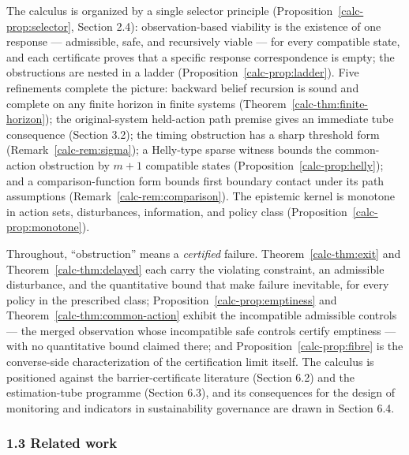 \documentclass[10pt,twocolumn]{article}
\theoremstyle{definition}
\begin{document}
The calculus is organized by a single selector principle (Proposition~\ref{calc-prop:selector}, Section 2.4):
observation-based viability is the existence of one response ---
admissible, safe, and recursively viable --- for every compatible state,
and each certificate proves that a specific response correspondence is
empty; the obstructions are nested in a ladder
(Proposition~\ref{calc-prop:ladder}). Five refinements complete the picture:
backward belief recursion is sound and complete on any finite horizon
in finite systems (Theorem~\ref{calc-thm:finite-horizon}); the original-system held-action path premise gives an immediate tube consequence (Section 3.2); the timing obstruction has a
sharp threshold form (Remark~\ref{calc-rem:sigma}); a Helly-type sparse
witness bounds the common-action obstruction by \(m+1\) compatible
states (Proposition~\ref{calc-prop:helly}); and a comparison-function form bounds first boundary contact under its path assumptions (Remark~\ref{calc-rem:comparison}). The epistemic kernel is monotone in
action sets, disturbances, information, and policy class
(Proposition~\ref{calc-prop:monotone}).

Throughout, ``obstruction'' means a \emph{certified} failure. Theorem~\ref{calc-thm:exit} and Theorem~\ref{calc-thm:delayed} each carry the violating constraint, an admissible disturbance,
and the quantitative bound that make failure inevitable, for every policy in the prescribed class; Proposition~\ref{calc-prop:emptiness} and Theorem~\ref{calc-thm:common-action} exhibit the incompatible
admissible controls --- the merged observation whose incompatible safe
controls certify emptiness --- with no quantitative bound claimed there;
and Proposition~\ref{calc-prop:fibre} is the converse-side characterization of the certification
limit itself. The calculus is positioned against
the barrier-certificate literature (Section 6.2) and the estimation-tube
programme (Section 6.3), and its consequences for the design of
monitoring and indicators in sustainability governance are drawn in
Section 6.4.

\subsubsection{1.3 Related work}\label{calc-related-work}
\end{document}
